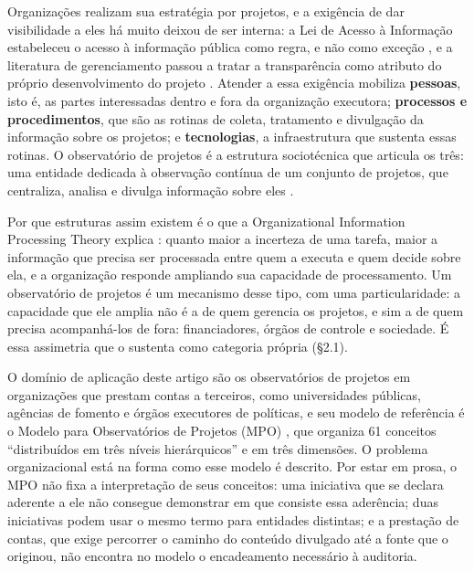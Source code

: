 Organizações realizam sua estratégia por projetos, e a exigência de dar visibilidade a eles há muito deixou de ser interna: a Lei de Acesso à Informação estabeleceu o acesso à informação pública como regra, e não como exceção \cite{L12527}, e a literatura de gerenciamento passou a tratar a transparência como atributo do próprio desenvolvimento do projeto \cite{betta2018transparency}. Atender a essa exigência mobiliza \textbf{pessoas}, isto é, as partes interessadas dentro e fora da organização executora; \textbf{processos e procedimentos}, que são as rotinas de coleta, tratamento e divulgação da informação sobre os projetos; e \textbf{tecnologias}, a infraestrutura que sustenta essas rotinas. O observatório de projetos é a estrutura sociotécnica que articula os três: uma entidade dedicada à observação contínua de um conjunto de projetos, que centraliza, analisa e divulga informação sobre eles \cite{vieira2021model}.

Por que estruturas assim existem é o que a Organizational Information Processing Theory explica \cite{galbraith1973designing,galbraith1974organization}: quanto maior a incerteza de uma tarefa, maior a informação que precisa ser processada entre quem a executa e quem decide sobre ela, e a organização responde ampliando sua capacidade de processamento. Um observatório de projetos é um mecanismo desse tipo, com uma particularidade: a capacidade que ele amplia não é a de quem gerencia os projetos, e sim a de quem precisa acompanhá-los de fora: financiadores, órgãos de controle e sociedade. É essa assimetria que o sustenta como categoria própria (\S{}2.1).

O domínio de aplicação deste artigo são os observatórios de projetos em organizações que prestam contas a terceiros, como universidades públicas, agências de fomento e órgãos executores de políticas, e seu modelo de referência é o Modelo para Observatórios de Projetos (MPO) \cite{vieira2021model,farias2025conceptual}, que organiza 61 conceitos ``distribuídos em três níveis hierárquicos'' e em três dimensões. O problema organizacional está na forma como esse modelo é descrito. Por estar em prosa, o MPO não fixa a interpretação de seus conceitos: uma iniciativa que se declara aderente a ele não consegue demonstrar em que consiste essa aderência; duas iniciativas podem usar o mesmo termo para entidades distintas; e a prestação de contas, que exige percorrer o caminho do conteúdo divulgado até a fonte que o originou, não encontra no modelo o encadeamento necessário à auditoria.

